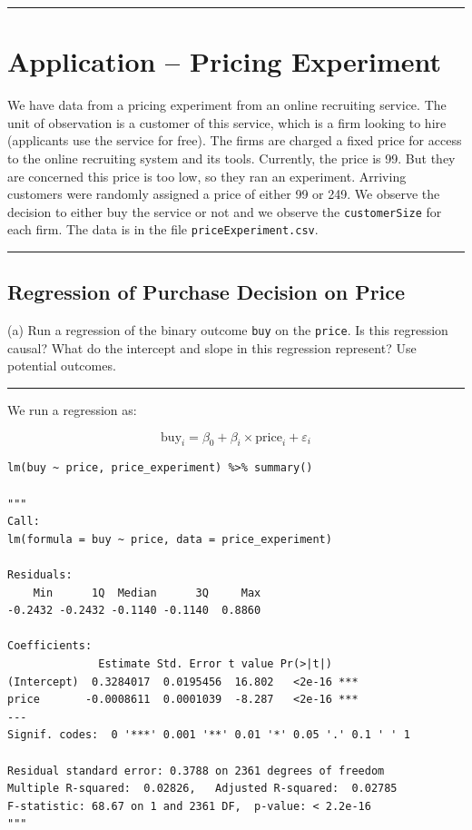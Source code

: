 \documentclass{article}
\newenvironment{colorparagraph}[1]{\par\color{#1}}{\par}
\begin{document}
\newpage

\begin{colorparagraph}{questioncolor}
\rule{\textwidth}{0.5pt}

\label{q3}\section{Application -- Pricing Experiment}

We have data from a pricing experiment from an online recruiting service. The unit of observation is a customer of this service, which is a firm looking to hire (applicants use the service for free). The firms are charged a fixed price for access to the online recruiting system and its tools. Currently, the price is 99. But they are concerned this price is too low, so they ran an experiment. Arriving customers were randomly assigned a price of either 99 or 249. We observe the decision to either buy the service or not and we observe the \texttt{customerSize} for each firm. The data is in the file \texttt{priceExperiment.csv}.

\rule{\textwidth}{0.5pt}
\end{colorparagraph}

\begin{colorparagraph}{questioncolor}
\label{q3a}\subsection{Regression of Purchase Decision on Price}
(a) Run a regression of the binary outcome \texttt{buy} on the \texttt{price}. Is this regression causal? What do the intercept and slope in this regression represent? Use potential outcomes.

\rule{\textwidth}{0.5pt}
\end{colorparagraph}

We run a regression as:

$$
\text{buy}_i = \beta_0 + \beta_i \times \text{price}_i + \varepsilon_i
$$

\begin{lstlisting}[style=Rstyle, caption=Simple Regression on Price Experiment]
lm(buy ~ price, price_experiment) %>% summary()

"""
Call:
lm(formula = buy ~ price, data = price_experiment)

Residuals:
    Min      1Q  Median      3Q     Max 
-0.2432 -0.2432 -0.1140 -0.1140  0.8860 

Coefficients:
              Estimate Std. Error t value Pr(>|t|)    
(Intercept)  0.3284017  0.0195456  16.802   <2e-16 ***
price       -0.0008611  0.0001039  -8.287   <2e-16 ***
---
Signif. codes:  0 '***' 0.001 '**' 0.01 '*' 0.05 '.' 0.1 ' ' 1

Residual standard error: 0.3788 on 2361 degrees of freedom
Multiple R-squared:  0.02826,	Adjusted R-squared:  0.02785 
F-statistic: 68.67 on 1 and 2361 DF,  p-value: < 2.2e-16
"""

\end{lstlisting}
\end{document}

